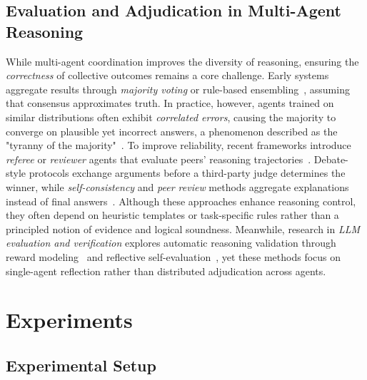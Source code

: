 \documentclass{article}
\theoremstyle{plain}
\theoremstyle{definition}
\theoremstyle{remark}
\begin{document}
\subsection{Evaluation and Adjudication in Multi-Agent Reasoning}
\label{app:relatedwork_part2}

While multi-agent coordination improves the diversity of reasoning, ensuring the \textit{correctness} of collective outcomes remains a core challenge.  
Early systems aggregate results through \emph{majority voting} or rule-based ensembling~\cite{chan2023chateval,chen2024llmarena,wei2025lero}, assuming that consensus approximates truth.  
In practice, however, agents trained on similar distributions often exhibit \textit{correlated errors}, causing the majority to converge on plausible yet incorrect answers, a phenomenon described as the "tyranny of the majority"~\cite{du2023improving,liu2024groupdebate}. To improve reliability, recent frameworks introduce \emph{referee} or \emph{reviewer} agents that evaluate peers’ reasoning trajectories~\cite{abdelnabi2023llm,du2023improving,zhang2024cut}.  
Debate-style protocols exchange arguments before a third-party judge determines the winner, while \emph{self-consistency} and \emph{peer review} methods aggregate explanations instead of final answers~\cite{chen2023universal,xu2023towards,wang2025mars}.  
Although these approaches enhance reasoning control, they often depend on heuristic templates or task-specific rules rather than a principled notion of evidence and logical soundness.  
Meanwhile, research in \emph{LLM evaluation and verification} explores automatic reasoning validation through reward modeling~\cite{kwon2023reward,lambert2024rewardbench,setlur2024rewarding} and reflective self-evaluation~\cite{xie2023self,zhang2024self,yan2024mirror}, yet these methods focus on single-agent reflection rather than distributed adjudication across agents.  








\section{Experiments}

\subsection{Experimental Setup}
\label{ref:app_exp_setup}
\end{document}
